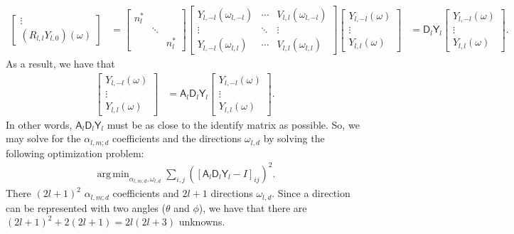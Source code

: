 \documentclass[10pt]{article}
\DeclareMathOperator*{\argmin}{arg\,min}
\begin{document}
\begin{itemize}
\begin{align*}
\begin{bmatrix}
                \vdots \\
                (R_{l,l} Y_{l,0}) (\omega)
            \end{bmatrix}
            &=
            \begin{bmatrix}
                n_l^* & & \\
                & \ddots & \\
                & & n_l^*
            \end{bmatrix}
            \begin{bmatrix}
                Y_{l,-l}(\omega_{l,-l}) & \cdots & V_{l,l}(\omega_{l,-l}) \\
                \vdots & \ddots & \vdots \\
                Y_{l,-l}(\omega_{l,l}) & \cdots & V_{l,l}(\omega_{l,l})
            \end{bmatrix}
            \begin{bmatrix}
                Y_{l,-l}(\omega) \\
                \vdots \\
                Y_{l,l}(\omega)
            \end{bmatrix}
            &= \mathsf{D}_l \mathsf{Y}_l
            \begin{bmatrix}
                Y_{l,-l}(\omega) \\
                \vdots \\
                Y_{l,l}(\omega)
            \end{bmatrix}.
        \end{align*}
        As a result, we have that
        \begin{align*}
            \begin{bmatrix}
                Y_{l,-l}(\omega) \\
                \vdots \\
                Y_{l,l}(\omega)
            \end{bmatrix}
            &= \mathsf{A}_l \mathsf{D}_l \mathsf{Y}_l 
            \begin{bmatrix}
                Y_{l,-l}(\omega) \\
                \vdots \\
                Y_{l,l}(\omega)
            \end{bmatrix}.
        \end{align*}
        In other words, $\mathsf{A}_l \mathsf{D}_l \mathsf{Y}_l$ must be as close to the identify matrix as possible.  So, we may solve for the $\alpha_{l,m;d}$ coefficients and the directions $\omega_{l,d}$ by solving the following optimization problem:
        \begin{align*}
            \argmin_{\alpha_{l,m;d},\omega_{l,d}} \sum_{i,j} ([\mathsf{A}_l \mathsf{D}_l \mathsf{Y}_l - I]_{ij})^2.
        \end{align*}
        There $(2l+1)^2$ $\alpha_{l,m;d}$ coefficients and $2l+1$ directions $\omega_{l,d}$.  Since a direction can be represented with two angles ($\theta$ and $\phi$), we have that there are $(2l+1)^2 + 2(2l+1) = 2l(2l+3)$ unknowns.


\end{itemize}
\end{document}
